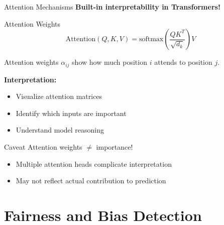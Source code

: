 \documentclass[aspectratio=169]{beamer}
\begin{document}
\begin{frame}{Attention Mechanisms}
  \textbf{Built-in interpretability in Transformers!}

  \vspace{0.5em}

  \begin{definitionbox}{Attention Weights}
    \begin{equation}
      \text{Attention}(Q, K, V) = \text{softmax}\left(\frac{QK^T}{\sqrt{d_k}}\right)V
    \end{equation}

    Attention weights $\alpha_{ij}$ show how much position $i$ attends to position $j$.
  \end{definitionbox}

  \vspace{0.5em}

  \textbf{Interpretation:}
  \begin{itemize}
    \item Visualize attention matrices
    \item Identify which inputs are important
    \item Understand model reasoning
  \end{itemize}

  \vspace{0.5em}

  \begin{alertbox}{Caveat}
    Attention weights $\neq$ importance!
    \begin{itemize}
      \item Multiple attention heads complicate interpretation
      \item May not reflect actual contribution to prediction
    \end{itemize}
  \end{alertbox}
\end{frame}

\section{Fairness and Bias Detection}
\end{document}
